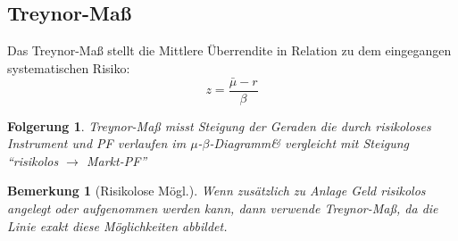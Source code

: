 \documentclass[a4paper]{article}
\theoremstyle{break}
\newcommand{\mbd}{$\mu$-$\beta$-Diagramm}
\newtheorem{ann}{Bemerkung}[section]
\newtheorem{der}{Folgerung}[section]
\begin{document}
\subsection{Treynor-Maß}
    Das Treynor-Maß stellt die Mittlere Überrendite in Relation zu dem eingegangen systematischen Risiko:
    $$z = \frac{\bar{\mu} - r}{\beta}$$
    \begin{der}
       Treynor-Maß misst Steigung der Geraden die durch risikoloses Instrument und PF verlaufen im \mbd \& vergleicht mit Steigung ``risikolos $\rightarrow$ Markt-PF''
    \end{der}
    \begin{ann}[Risikolose Mögl.]
        Wenn zusätzlich zu Anlage Geld risikolos angelegt oder aufgenommen werden kann, dann verwende Treynor-Maß, da die Linie exakt diese Möglichkeiten abbildet.
    \end{ann}

\end{document}
